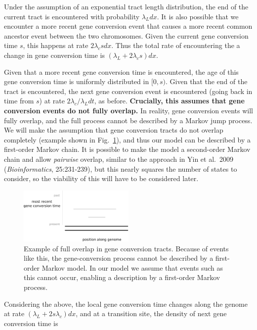 \documentclass{article}
\begin{document}
Under the assumption of an exponential tract length distribution, the end of
the current tract is encountered with probability $\lambda_Ldx$. It is also
possible that we encounter a more recent gene conversion event that causes a
more recent common ancestor event between the two chromosomes. Given the
current gene conversion time $s$, this happens at rate $2\lambda_c s dx$. Thus
the total rate of encountering the a change in gene conversion time is
$(\lambda_L+2\lambda_cs)dx$.

Given that a more recent gene conversion time is encountered, the age of this
gene conversion time is uniformly distributed in $[0,s)$. Given that the end of
the tract is encountered, the next gene conversion event is encountered (going
back in time from $s$) at rate $2\lambda_c/\lambda_L dt$, as before.
\textbf{Crucially, this assumes that gene conversion events do not fully
overlap.} In reality, gene conversion events will fully overlap, and the full
process cannot be described by a Markov jump process. We will make the
assumption that gene conversion tracts do not overlap completely (example shown
in Fig.~\ref{fig:overlap}), and thus our model can be described by a
first-order Markov chain. It is possible to make the model a second-order
Markov chain and allow \emph{pairwise} overlap, similar to the approach in Yin
et al.\ 2009 (\textit{Bioinformatics}, 25:231-239), but this nearly squares the
number of states to consider, so the viability of this will have to be
considered later.

\begin{figure}
    \centering
    \includegraphics[width=0.5\textwidth]{figs/overlap.pdf}
    \caption{Example of full overlap in gene conversion tracts. Because of
    events like this, the gene-conversion process cannot be described by a
    first-order Markov model. In our model we assume that events such as this
    cannot occur, enabling a description by a first-order Markov process.}
    \label{fig:overlap}
\end{figure}

Considering the above, the local gene conversion time changes along the genome
at rate $(\lambda_L + 2s\lambda_c)dx$, and at a transition site, the density of
next gene conversion time is
\end{document}
